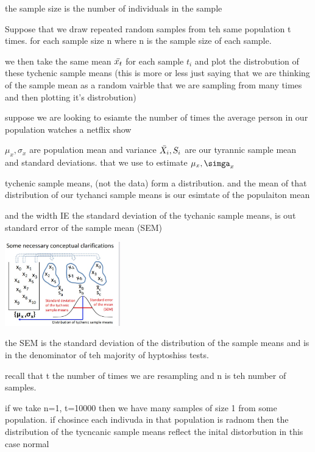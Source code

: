 \documentclass{article}
\begin{document}
\item the sample size is the number of individuals in the sample
\item Suppose that we draw repeated random samples from teh same population t times. for each sample size n where n is the sample size of each sample. 
\item we then take the same mean $\Bar{x_t}$ for each sample $t_i$ and plot the distrobution of these tychenic sample means (this is more or less just saying that we are thinking of the sample mean as a random vairble that we are sampling from many times and then plotting it's distrobution) 
\item suppose we are looking to esiamte the number of times the average person in our population watches a netflix show
\item $\mu_{x}, \sigma_{x}$ are population mean and variance 
\itme $\Bar{X_i}, S_i$ are our tyrannic sample mean and standard deviations. that we use to estimate $\mu_x, \simga_x$ 
\item tychenic sample means, (not the data) form a distribution. and the mean of that distribution of our tychanci sample means is our esimtate of the populaiton mean 
\item and the width IE the standard deviation of the tychanic sample means, is out standard error of the sample mean (SEM) 
\item  \includegraphics[width=5cm]{Final_Review/lecture_3/sample_mean_primer.jpg} 
\item the SEM is the standard deviation of the distribution of the sample means and is in the denominator of teh majority of hyptoshiss tests. 
\item recall that t the number of times we are resampling and n is teh number of samples. 
\item if we take n=1, t=10000 then we have many samples of size 1 from some population. if chosince each indivuda in that population is radnom then the distribution of the tycncanic sample means reflect the inital distorbution in this case normal 
\end{document}
